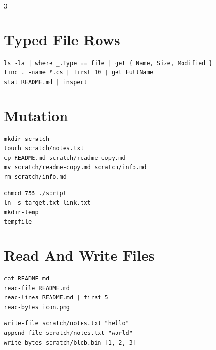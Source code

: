 \begin{multicols*}{3}
\section{Typed File Rows}
\begin{lstlisting}
ls -la | where _.Type == file | get { Name, Size, Modified }
find . -name *.cs | first 10 | get FullName
stat README.md | inspect
\end{lstlisting}


\columnbreak

\section{Mutation}
\begin{lstlisting}
mkdir scratch
touch scratch/notes.txt
cp README.md scratch/readme-copy.md
mv scratch/readme-copy.md scratch/info.md
rm scratch/info.md
\end{lstlisting}

\begin{lstlisting}
chmod 755 ./script
ln -s target.txt link.txt
mkdir-temp
tempfile
\end{lstlisting}


\section{Read And Write Files}
\begin{lstlisting}
cat README.md
read-file README.md
read-lines README.md | first 5
read-bytes icon.png
\end{lstlisting}

\begin{lstlisting}
write-file scratch/notes.txt "hello"
append-file scratch/notes.txt "world"
write-bytes scratch/blob.bin [1, 2, 3]
\end{lstlisting}


\end{multicols*}
